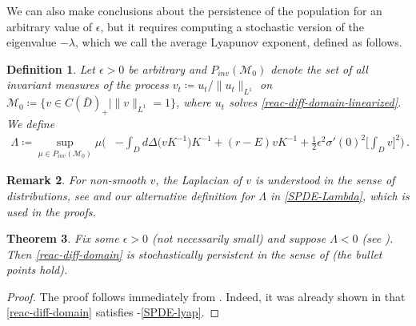 \documentclass[final]{amsart}
\newtheorem{thm}{Theorem}
\newtheorem{deff}[thm]{Definition}
\newtheorem{rem}[thm]{Remark}
\numberwithin{thm}{section}
\numberwithin{equation}{section}
\newcommand{\mcM}{\mathcal{M}}
\newcommand{\cdom}{C(\overline D)_+}
\begin{document}
We can also make conclusions about the persistence of the population for an arbitrary value of $\epsilon$, but it requires computing a stochastic version of the eigenvalue $-\lambda$, which we call the average Lyapunov exponent, defined as follows.
\begin{deff}\label{reac-diff-domain-avg-lyap-exp}
    Let $\epsilon > 0$ be arbitrary and $P_{inv}(\mcM_0)$ denote the set of all invariant measures of the process $v_t \coloneqq u_t/\|u_t\|_{L^1}$ on $\mcM_0 \coloneqq \{v \in \cdom \mid \|v\|_{L^1} = 1\}$, where $u_t$ solves \eqref{reac-diff-domain-linearized}. We define \begin{equation}\label{eq-reac-diff-domain-Lambda}
        \begin{aligned}
            \Lambda \coloneqq \sup_{\mu \in P_{inv}(\mcM_0)} \mu \Big(&-\int_D d\Delta\Big(vK^{-1}\Big)K^{-1} + (r - E)vK^{-1} + \frac{1}{2}\epsilon^2\sigma'(0)^2\Big[\int_D v\Big]^2 \Big) \,.
        \end{aligned}
    \end{equation}
\end{deff}
\begin{rem}
For non-smooth $v$, the Laplacian of $v$ is understood in the sense of distributions, 
    see  and our alternative definition for $\Lambda$ in \eqref{SPDE-Lambda}, which is used in the proofs.
\end{rem}

\begin{thm}
\label{reac-diff-domain-stoch-thm}
    Fix some $\epsilon > 0$ (not necessarily small) and suppose $\Lambda < 0$ (see ). Then \eqref{reac-diff-domain} is stochastically persistent in the sense of  (the bullet points hold).
\end{thm}

\begin{proof}
    The proof follows immediately from . Indeed, it was already shown in  that \eqref{reac-diff-domain} satisfies -\ref{SPDE-lyap}.
    
    
    
    
    
    
    
    
    
    
    
    
    
    
    
\end{proof}
\end{document}
